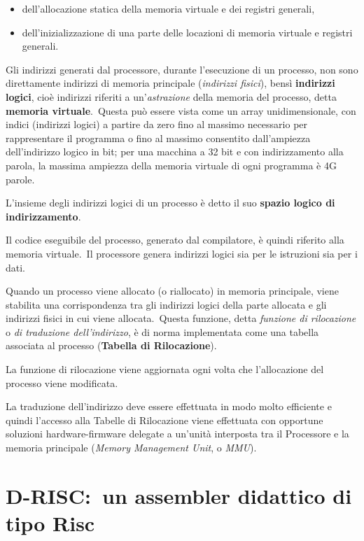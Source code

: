 \begin{itemize}
    \item dell'allocazione statica della memoria virtuale e dei registri generali,
    \item dell'inizializzazione di una parte delle locazioni di memoria virtuale e registri generali.
\end{itemize}

\noindent Gli indirizzi generati dal processore, durante l'esecuzione di un processo, non sono direttamente indirizzi di memoria principale (\textit{indirizzi fisici}), bensì \textbf{indirizzi logici}, cioè indirizzi riferiti a un'\textit{astrazione} della memoria del processo, detta \textbf{memoria virtuale}.\
Questa può essere vista come un array unidimensionale, con indici (indirizzi logici) a partire da zero fino al massimo necessario per rappresentare il programma o fino al massimo consentito dall'ampiezza dell'indirizzo logico in bit; per una macchina a 32 bit e con indirizzamento alla parola, la massima ampiezza della memoria virtuale di ogni programma è 4G parole.

L'insieme degli indirizzi logici di un processo è detto il suo \textbf{spazio logico di indirizzamento}.

Il codice eseguibile del processo, generato dal compilatore, è quindi riferito alla memoria virtuale.\
Il processore genera indirizzi logici sia per le istruzioni sia per i dati.

Quando un processo viene allocato (o riallocato) in memoria principale, viene stabilita una corrispondenza tra gli indirizzi logici della parte allocata e gli indirizzi fisici in cui viene allocata.\
Questa funzione, detta \textit{funzione di rilocazione} o \textit{di traduzione dell'indirizzo}, è di norma implementata come una tabella associata al processo (\textbf{Tabella di Rilocazione}).

La funzione di rilocazione viene aggiornata ogni volta che l'allocazione del processo viene modificata.

La traduzione dell'indirizzo deve essere effettuata in modo molto efficiente e quindi l'accesso alla Tabelle di Rilocazione viene effettuata con opportune soluzioni hardware-firmware delegate a un'unità interposta tra il Processore e la memoria principale (\textit{Memory Management Unit}, o \textit{MMU}).

\newpage

\section{D-RISC:\ un assembler didattico di tipo Risc}


